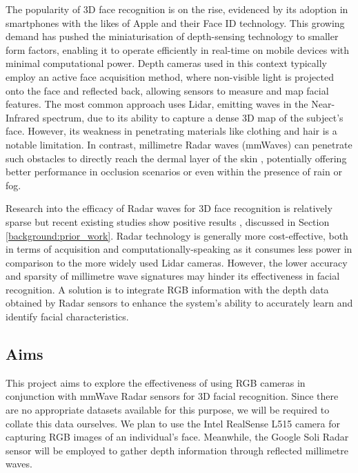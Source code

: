 \documentclass{interim}
\begin{document}
The popularity of 3D face recognition is on the rise, evidenced by its adoption in smartphones with the likes of Apple and their Face ID \cite{apple-faceid} technology. This growing demand has pushed the miniaturisation of depth-sensing technology to smaller form factors, enabling it to operate efficiently in real-time on mobile devices with minimal computational power. Depth cameras used in this context typically employ an active face acquisition method, where non-visible light is projected onto the face and reflected back, allowing sensors to measure and map facial features. The most common approach uses Lidar, emitting waves in the Near-Infrared spectrum, due to its ability to capture a dense 3D map of the subject's face. However, its weakness in penetrating materials like clothing and hair is a notable limitation. In contrast, millimetre Radar waves (mmWaves) can penetrate such obstacles to directly reach the dermal layer of the skin \cite{vizard2006advances}, potentially offering better performance in occlusion scenarios or even within the presence of rain or fog.

Research into the efficacy of Radar waves for 3D face recognition is relatively sparse but recent existing studies show positive results \cite{hof2020face, lim2020dnn,kim2020face, pho2021radar,challa2021face}, discussed in Section \ref{background:prior_work}. Radar technology is generally more cost-effective, both in terms of acquisition and computationally-speaking as it consumes less power in comparison to the more widely used Lidar cameras. However, the lower accuracy and sparsity of millimetre wave signatures may hinder its effectiveness in facial recognition. A solution is to integrate RGB information with the depth data obtained by Radar sensors to enhance the system's ability to accurately learn and identify facial characteristics.


\subsection{Aims}
This project aims to explore the effectiveness of using RGB cameras in conjunction with mmWave Radar sensors for 3D facial recognition. Since there are no appropriate datasets available for this purpose, we will be required to collate this data ourselves. We plan to use the Intel RealSense L515 camera \cite{intel-l515} for capturing RGB images of an individual's face. Meanwhile, the Google Soli Radar sensor \cite{lien2016soli} will be employed to gather depth information through reflected millimetre waves.
\end{document}

